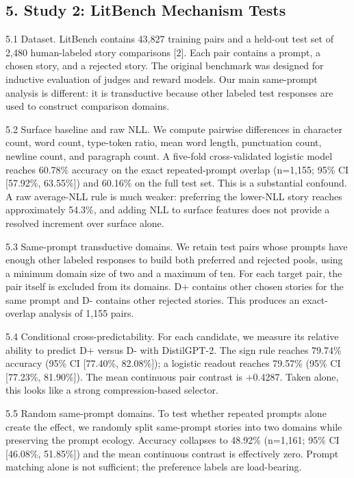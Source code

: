\documentclass[
]{article}
\begin{document}
\subsection{5. Study 2: LitBench Mechanism
Tests}\label{study-2-litbench-mechanism-tests}

5.1 Dataset. LitBench contains 43,827 training pairs and a held-out test
set of 2,480 human-labeled story comparisons {[}2{]}. Each pair contains
a prompt, a chosen story, and a rejected story. The original benchmark
was designed for inductive evaluation of judges and reward models. Our
main same-prompt analysis is different: it is transductive because other
labeled test responses are used to construct comparison domains.

5.2 Surface baseline and raw NLL. We compute pairwise differences in
character count, word count, type-token ratio, mean word length,
punctuation count, newline count, and paragraph count. A five-fold
cross-validated logistic model reaches 60.78\% accuracy on the exact
repeated-prompt overlap (n=1,155; 95\% CI {[}57.92\%, 63.55\%{]}) and
60.16\% on the full test set. This is a substantial confound. A raw
average-NLL rule is much weaker: preferring the lower-NLL story reaches
approximately 54.3\%, and adding NLL to surface features does not
provide a resolved increment over surface alone.

5.3 Same-prompt transductive domains. We retain test pairs whose prompts
have enough other labeled responses to build both preferred and rejected
pools, using a minimum domain size of two and a maximum of ten. For each
target pair, the pair itself is excluded from its domains. D+ contains
other chosen stories for the same prompt and D- contains other rejected
stories. This produces an exact-overlap analysis of 1,155 pairs.

5.4 Conditional cross-predictability. For each candidate, we measure its
relative ability to predict D+ versus D- with DistilGPT-2. The sign rule
reaches 79.74\% accuracy (95\% CI {[}77.40\%, 82.08\%{]}); a logistic
readout reaches 79.57\% (95\% CI {[}77.23\%, 81.90\%{]}). The mean
continuous pair contrast is +0.4287. Taken alone, this looks like a
strong compression-based selector.

5.5 Random same-prompt domains. To test whether repeated prompts alone
create the effect, we randomly split same-prompt stories into two
domains while preserving the prompt ecology. Accuracy collapses to
48.92\% (n=1,161; 95\% CI {[}46.08\%, 51.85\%{]}) and the mean
continuous contrast is effectively zero. Prompt matching alone is not
sufficient; the preference labels are load-bearing.
\end{document}
